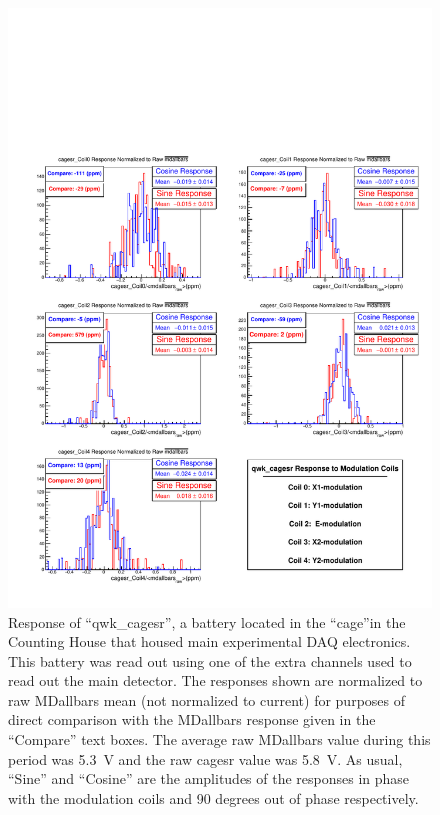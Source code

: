 \begin{figure}[ht]
\centering
\includegraphics[width=6in]{./Pictures/cagesr_coeff.pdf}
\caption{\label{fig:cagesr}Response of ``qwk\_cagesr'', a battery located in the ``cage''in the Counting House that housed main experimental DAQ electronics. This battery was read out using one of the extra channels used to read out the main detector. The responses shown are normalized to raw MDallbars mean (not normalized to current) for purposes of direct comparison with the MDallbars response given in the ``Compare'' text boxes.  The average raw MDallbars value during this period was 5.3~V and the raw cagesr value was 5.8~V. As usual, ``Sine'' and ``Cosine'' are the amplitudes of the responses in phase with the modulation coils and 90 degrees out of phase respectively.}
\end{figure}
\FloatBarrier

